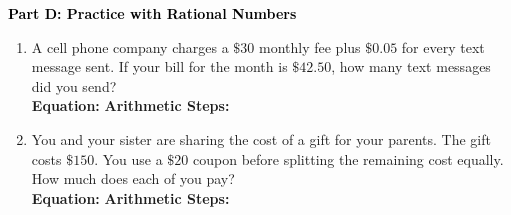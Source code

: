 \documentclass[12pt, letterpaper, fleqn]{article}
\newcommand{\blanklong}{\underline{\hspace{6.5cm}}}
\begin{document}
\newpage

\begin{tcolorbox}[colback=customteal!20]
\large\textcolor{black}{\textbf{Part D: Practice with Rational Numbers}}
\end{tcolorbox}

\vspace{3mm}

\begin{enumerate}[itemsep=4.2cm, leftmargin=0.6cm, resume]
\item A cell phone company charges a $\$30$ monthly fee plus $\$0.05$ for every text message sent. If your bill for the month is $\$42.50$, how many text messages did you send?\\
\textbf{Equation:} \blanklong \hspace{1cm} \textbf{Arithmetic Steps:}\\
\item You and your sister are sharing the cost of a gift for your parents. The gift costs $\$150$. You use a $\$20$ coupon before splitting the remaining cost equally. How much does each of you pay?\\
\textbf{Equation:} \blanklong \hspace{1cm} \textbf{Arithmetic Steps:}\\
\end{enumerate}
\end{document}
